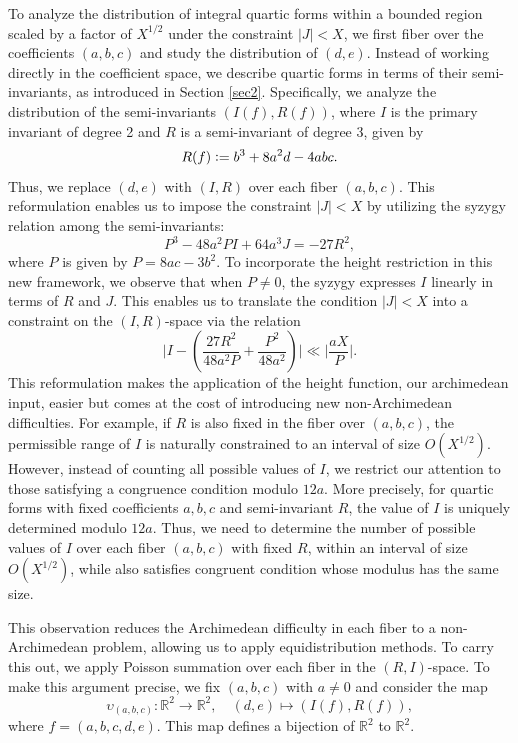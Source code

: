 \documentclass{article}
\def\R{{\mathbb R}}
\def\JP{\frac{27R^2}{48a^2P}+\frac{P^2}{48a^2}}
\begin{document}
To analyze the distribution of integral quartic forms within a bounded region scaled by a factor of $X^{1/2}$ under the constraint $|J| < X$, we first fiber over the coefficients $(a, b, c)$ and study the distribution of $(d, e)$. Instead of working directly in the coefficient space, we describe quartic forms in terms of their semi-invariants, as introduced in Section \ref{sec2}. Specifically, we analyze the distribution of the semi-invariants $(I(f), R(f))$, where $I$ is the primary invariant of degree 2 and $R$ is a semi-invariant of degree 3, given by  
\begin{equation*}
    R(f) \vcentcolon= b^3 + 8a^2d - 4abc.
\end{equation*}
Thus, we replace $(d, e)$ with $(I, R)$ over each fiber $(a, b, c)$. This reformulation enables us to impose the constraint $|J| < X$ by utilizing the syzygy relation among the semi-invariants:
\begin{equation*}
    P^3 - 48a^2PI + 64a^3J = -27R^2,
\end{equation*}
where $P$ is given by $P = 8ac - 3b^2$. To incorporate the height restriction in this new framework, we observe that when $P \neq 0$, the syzygy expresses $I$ linearly in terms of $R$ and $J$. This enables us to translate the condition $|J| < X$ into a constraint on the $(I, R)$-space via the relation
\begin{equation*}
\big|I-(\JP)\big|\ll \bigg|\frac{aX}{P}\bigg|.
\end{equation*}
This reformulation makes the application of the height function, our archimedean input, easier but comes at the cost of introducing new non-Archimedean difficulties. For example, if $R$ is also fixed in the fiber over $(a, b, c)$, the permissible range of $I$ is naturally constrained to an interval of size $O(X^{1/2})$. However, instead of counting all possible values of $I$, we restrict our attention to those satisfying a congruence condition modulo $12a$. More precisely, for quartic forms with fixed coefficients $a, b, c$ and semi-invariant $R$, the value of $I$ is uniquely determined modulo $12a$.  Thus, we need to determine the number of possible values of $I$ over each fiber $(a, b, c)$ with fixed $R$, within an interval of size $O(X^{1/2})$, while also satisfies congruent condition whose modulus has the same size.

This observation reduces the Archimedean difficulty in each fiber to a non-Archimedean problem, allowing us to apply equidistribution methods.  To carry this out, we apply Poisson summation over each fiber in the $(R, I)$-space. To make this argument precise, we fix $(a, b, c)$ with $a \neq 0$ and consider the map
\begin{equation*}
    \upsilon_{(a,b,c)}\colon  \R^{2} \rightarrow \R^2, \quad (d,e) \mapsto (I(f),R(f)),
\end{equation*}
where $f=(a,b,c,d,e)$. This map defines a bijection of $\R^2$ to $\R^2$.
\end{document}
